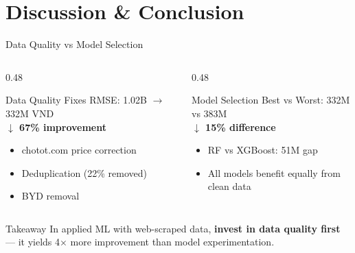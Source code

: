 \documentclass[aspectratio=169]{beamer}
\begin{document}
\section{Discussion \& Conclusion}

\begin{frame}{Data Quality vs Model Selection}
  \begin{columns}[T]
    \begin{column}{0.48\textwidth}
      \begin{block}{Data Quality Fixes}
        RMSE: 1.02B $\to$ 332M VND\\
        \textcolor{fptgood}{\textbf{$\downarrow$ 67\% improvement}}
        \begin{itemize}
          \small
          \item chotot.com price correction
          \item Deduplication (22\% removed)
          \item BYD removal
        \end{itemize}
      \end{block}
    \end{column}
    \begin{column}{0.48\textwidth}
      \begin{block}{Model Selection}
        Best vs Worst: 332M vs 383M\\
        \textcolor{fptaccent}{\textbf{$\downarrow$ 15\% difference}}
        \begin{itemize}
          \small
          \item RF vs XGBoost: 51M gap
          \item All models benefit equally from clean data
        \end{itemize}
      \end{block}
    \end{column}
  \end{columns}

  \vspace{1em}
  \begin{alertblock}{Takeaway}
    In applied ML with web-scraped data, \textbf{invest in data quality first} --- it yields 4$\times$ more improvement than model experimentation.
  \end{alertblock}
\end{frame}
\end{document}
